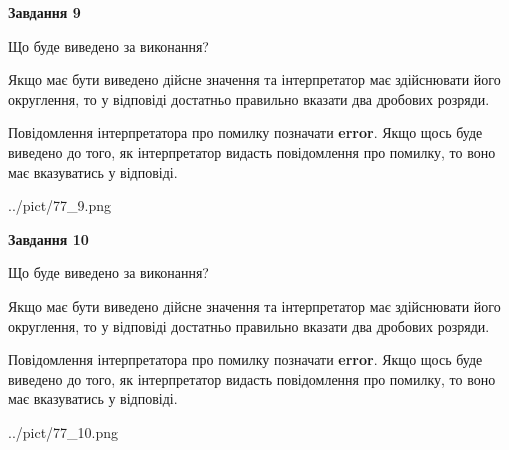 \documentclass[12pt, ukrainian]{article}
\begin{document}
{\begin {Large}
{\begin {center}\textbf{Завдання 9}\end {center}}\par
Що буде виведено за виконання? \par

Якщо має бути виведено дійсне значення та інтерпретатор має здійснювати його округлення, 
то у відповіді достатньо правильно вказати два дробових розряди.

Повідомлення інтерпретатора про помилку позначати \textbf{error}.
Якщо щось буде виведено до того, як інтерпретатор видасть повідомлення про помилку, 
то воно має вказуватись у відповіді. \par

\begin{center}
	{../pict/77_9.png}
\end{center}
\newpage

{\begin {center}\textbf{Завдання 10}\end {center}}\par
Що буде виведено за виконання? \par

Якщо має бути виведено дійсне значення та інтерпретатор має здійснювати його округлення, 
то у відповіді достатньо правильно вказати два дробових розряди.

Повідомлення інтерпретатора про помилку позначати \textbf{error}.
Якщо щось буде виведено до того, як інтерпретатор видасть повідомлення про помилку, 
то воно має вказуватись у відповіді. \par

\begin{center}
	{../pict/77_10.png}
\end{center}
\newpage

\end {Large}}
\end{document}
